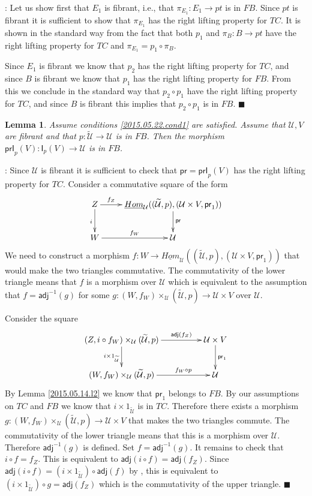 \documentclass[12pt]{article}
\numberwithin{equation}{section}
\newenvironment{myproof}{{\bf Proof}:}{$\blacksquare$ \vskip 5mm }
\newtheorem{lemma}[proposition]{Lemma}
\newcommand{\sr}{\rightarrow}
\newcommand{\uu}{\underline}
\newcommand{\iHom}{\uu{Hom}}
\newcommand{\wt}{\widetilde}
\newcommand{\dd}{\diamond}
\newcommand{\id}{1}            %
\newcommand{\U}{\mathcal{U}}
\newcommand{\I}{\mathsf{I}}
\newcommand{\pr}{\mathsf{pr}}
\newcommand{\prI}{\mathsf{prI}}
\newcommand{\adj}{\mathsf{adj}}
\begin{document}
%
\begin{myproof}
Let us show first that $E_1$ is fibrant, i.e., that $\pi_{E_1}:E_1\sr pt$ is in
$FB$. Since $pt$ is fibrant it is sufficient to show that $\pi_{E_1}$ has the
right lifting property for $TC$. It is shown in the standard way from the fact
that both $p_1$ and $\pi_B:B\sr pt$ have the right lifting property for $TC$
and $\pi_{E_1}=p_1\circ \pi_B$.

Since $E_1$ is fibrant we know that $p_2$ has the right lifting property for
$TC$, and since $B$ is fibrant we know that $p_1$ has the right lifting property
for $FB$. From this we conclude in the standard way that $p_2\circ p_1$ have
the right lifting property for $TC$, and since $B$ is fibrant this implies that
$p_2\circ p_1$ is in $FB$.
\end{myproof}
%
\begin{lemma}
  \label{2015.05.14.l1}
  Assume conditions \ref{2015.05.22.cond1} are satisfied.
  Assume that $\U,V$ are fibrant and that $p:\wt{\U}\sr \U$
  is in $FB$. Then the morphism $\prI_p(V):\I_p(V)\sr \U$ is in $FB$.
\end{lemma}
%
\begin{myproof}
Since $\U$ is fibrant it is sufficient to check that $\pr=\prI_p(V)$ has the right
lifting property for $TC$. Consider a commutative square of the form
%
$$
\begin{xy}
          \xymatrix@C=2pc{ Z \ar[r]^-{f_Z} \ar[d]_{i} &
            \iHom_\U((\wt{\U},p),(\U\times V,\pr_1)) \ar[d]^{\pr}\\ W
            \ar[r]^-{f_W} & \U }
\end{xy}
$$
%
We need to construct a morphism $f:W\sr \iHom_\U((\wt{\U},p),(\U\times
V,\pr_1))$ that would make the two triangles commutative. The commutativity of
the lower triangle means that $f$ is a morphism over $\U$ which is equivalent to
the assumption that $f=\adj^{-1}(g)$ for some $g:(W,f_W)\times_\U (\wt{\U},p)\sr
\U\times V$ over $\U$.

Consider the square
%
$$
\begin{xy}
          \xymatrix@C=4pc{ (Z, i\circ f_W)\times_\U (\wt{\U},p)
            \ar[r]^-{\adj(f_Z)} \ar[d]_{i\times \id_{\wt{\U}}} & \U\times V
            \ar[d]^{\pr_1}\\ (W,f_W)\times_\U (\wt{\U},p) \ar[r]^-{f_W\dd p} & \U }
\end{xy}
$$
%
By Lemma \ref{2015.05.14.l2} we know that $\pr_1$ belongs to $FB$. By our
assumptions on $TC$ and $FB$ we know that $i\times \id_{\wt{\U}}$ is in
$TC$. Therefore there exists a morphism $g:(W,f_W)\times_\U (\wt{\U},p) \sr
\U\times V$ that makes the two triangles commute.  The commutativity of the
lower triangle means that this is a morphism over $\U$. Therefore $\adj^{-1}(g)$
is defined. Set $f=\adj^{-1}(g)$. It remains to check that $i\circ f=f_Z$. This
is equivalent to $\adj(i\circ f)=\adj(f_Z)$. Since $\adj(i\circ f)=(i\times
\id_{\wt{\U}})\circ \adj(f)$ by \cite[Lemma 8.7(3)]{fromunivwithPi}, this is
equivalent to $(i\times \id_{\wt{\U}})\circ g=\adj(f_Z)$ which is the
commutativity of the upper triangle.
\end{myproof}
\end{document}
